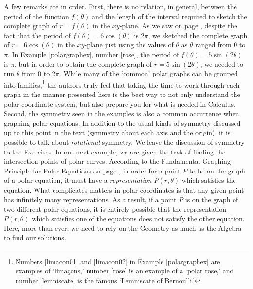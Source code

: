 A few remarks are in order.  First, there is no relation, in general,  between the period of the function $f(\theta)$  and the length of the interval required to sketch the complete graph of $r = f(\theta)$ in the $xy$-plane.  As we saw on page \pageref{circletangenttoyaxis}, despite the fact that the period of  $f(\theta) = 6\cos(\theta)$  is $2\pi$, we sketched the complete graph of $r = 6\cos(\theta)$ in the $xy$-plane just using the values of $\theta$ as $\theta$ ranged from $0$ to $\pi$.  In Example \ref{polargraphex}, number \ref{rose}, the period of $f(\theta) = 5\sin(2\theta)$ is $\pi$, but in order to obtain the complete graph of $r = 5\sin(2\theta)$, we needed to run $\theta$ from $0$ to $2\pi$. While many of the    `common' polar graphs can be grouped into families,\footnote{Numbers \ref{limacon01} and \ref{limacon02} in Example \ref{polargraphex} are examples of `\href{http://en.wikipedia.org/wiki/Limacon}{\underline{lima\c{c}ons}},' number \ref{rose} is an example of a `\href{http://en.wikipedia.org/wiki/Rose_(mathematics)}{\underline{polar rose}},' and number \ref{lemniscate} is the famous `\href{http://en.wikipedia.org/wiki/Lemniscate_of_Bernoulli}{\underline{Lemniscate of Bernoulli}}.'} the authors truly feel that taking the time to work through each graph in the manner presented here is the best way to not only understand the polar coordinate system, but also prepare you for what is needed in Calculus.  Second, the symmetry seen in the examples is also a common occurrence when graphing polar equations.  In addition to the usual kinds of symmetry discussed up to this point in the text (symmetry about each axis and the origin), it is possible to talk about \textit{rotational} symmetry.  We leave the discussion of symmetry to the Exercises.  In our next example, we are given the task of finding the intersection points of polar curves. According to the Fundamental Graphing Principle for Polar Equations on page \pageref{fgpp}, in order for a point $P$ to be on the graph of a polar equation, it must have a \textit{representation} $P(r,\theta)$ which satisfies the equation.  What complicates matters in polar coordinates is that any given point has infinitely many representations.  As a result, if a point $P$ is on the graph of two different polar equations, it is entirely possible that the representation $P(r,\theta)$ which satisfies one of the equations does not satisfy the other equation. Here, more than ever, we need to rely on the Geometry as much as the Algebra to find our solutions.


